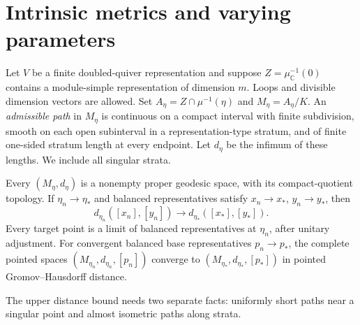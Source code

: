 \section{Intrinsic metrics and varying parameters}\label{sec:intrinsic}

Let $V$ be a finite doubled-quiver representation and suppose
$Z=\mu_{\mathbb C}^{-1}(0)$ contains a module-simple representation
of dimension $m$. Loops and divisible dimension vectors are allowed.
Set $A_\eta=Z\cap\mu^{-1}(\eta)$ and $M_\eta=A_\eta/K$.
An \emph{admissible path} in $M_\eta$ is continuous on a compact
interval with finite subdivision, smooth on each open subinterval
in a representation-type stratum, and of finite one-sided stratum
length at every endpoint. Let $d_\eta$ be the infimum of these
lengths. We include all singular strata.

\begin{theorem}\label{thm:varying-parameters}
Every $(M_\eta,d_\eta)$ is a nonempty proper geodesic space, with
its compact-quotient topology. If $\eta_n\to\eta_*$ and balanced
representatives satisfy $x_n\to x_*$, $y_n\to y_*$, then
\begin{equation}\label{eq:distance-continuity}
 d_{\eta_n}([x_n],[y_n])\longrightarrow
 d_{\eta_*}([x_*],[y_*]).
\end{equation}
Every target point is a limit of balanced representatives at
$\eta_n$, after unitary adjustment. For convergent balanced base
representatives $p_n\to p_*$, the complete pointed spaces
$(M_{\eta_n},d_{\eta_n},[p_n])$ converge to
$(M_{\eta_*},d_{\eta_*},[p_*])$ in pointed Gromov--Hausdorff distance.
\end{theorem}

The upper distance bound needs two separate facts: uniformly short
paths near a singular point and almost isometric paths along strata.

